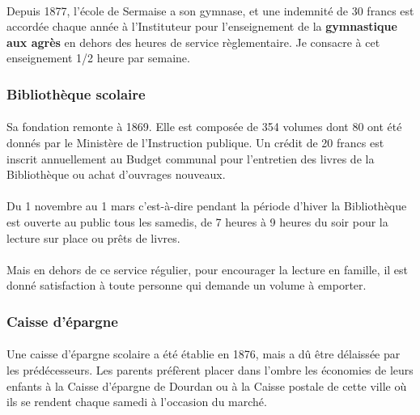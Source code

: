 \documentclass[../eBook.tex]{subfiles}
\begin{document}
    \paragraph{}Depuis 1877, l'école de Sermaise a son gymnase, et une indemnité de 30 francs est accordée chaque année à l'Instituteur pour l'enseignement de la \textbf{gymnastique aux agrès} en dehors des heures de service règlementaire. Je consacre à cet enseignement 1/2 heure par semaine.

    \subsubsection*{Bibliothèque scolaire}
      \paragraph{}Sa fondation remonte à 1869. Elle est composée de 354 volumes dont 80 ont été donnés par le Ministère de l'Instruction publique. Un crédit de 20 francs est inscrit annuellement au Budget communal pour l'entretien des livres de la Bibliothèque ou achat d'ouvrages nouveaux.
      \paragraph{}Du 1 novembre au 1 mars c'est-à-dire pendant la période d'hiver la Bibliothèque est ouverte au public tous les samedis, de 7 heures à 9 heures du soir pour la lecture sur place ou prêts de livres.
      \paragraph{}Mais en dehors de ce service régulier, pour encourager la lecture en famille, il est donné satisfaction à toute personne qui demande un volume à emporter.

    \newpage
    \subsubsection*{Caisse d'épargne}
      \paragraph{}Une caisse d'épargne scolaire a été établie en 1876, mais a dû être délaissée par les prédécesseurs. Les parents préfèrent placer dans l'ombre les économies de leurs enfants à la Caisse d'épargne de Dourdan ou à la Caisse postale de cette ville où ils se rendent chaque samedi à l'occasion du marché.
\end{document}
